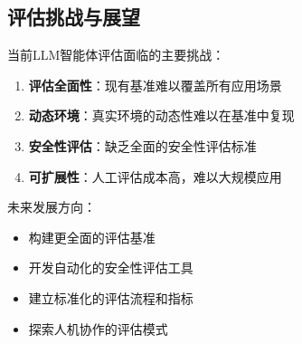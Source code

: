 \subsection{评估挑战与展望}

当前LLM智能体评估面临的主要挑战：

\begin{enumerate}[leftmargin=2em]
    \item \textbf{评估全面性}：现有基准难以覆盖所有应用场景
    \item \textbf{动态环境}：真实环境的动态性难以在基准中复现
    \item \textbf{安全性评估}：缺乏全面的安全性评估标准
    \item \textbf{可扩展性}：人工评估成本高，难以大规模应用
\end{enumerate}

未来发展方向：
\begin{itemize}[leftmargin=2em]
    \item 构建更全面的评估基准
    \item 开发自动化的安全性评估工具
    \item 建立标准化的评估流程和指标
    \item 探索人机协作的评估模式
\end{itemize}
